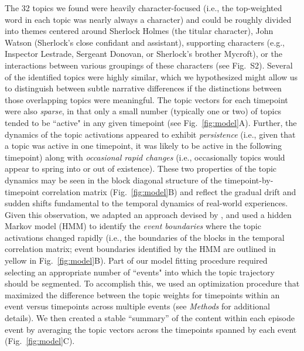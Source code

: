 \documentclass{article}
\newcommand{\topics}{S2}
\begin{document}
The 32 topics we found were heavily character-focused (i.e., the top-weighted word in each topic was nearly always a character) and could be roughly divided into themes centered around Sherlock Holmes (the titular character), John Watson (Sherlock's close confidant and assistant), supporting characters (e.g., Inspector Lestrade, Sergeant Donovan, or Sherlock's brother Mycroft), or the interactions between various groupings of these characters (see Fig.~\topics).  Several of the identified topics were highly similar, which we hypothesized might allow us to distinguish between subtle narrative differences if the distinctions between those overlapping topics were meaningful.  The topic vectors for each timepoint were also \textit{sparse}, in that only a small number (typically one or two) of topics tended to be ``active" in any given timepoint (see Fig.~\ref{fig:model}A).  Further, the dynamics of the topic activations appeared to exhibit \textit{persistence} (i.e., given that a topic was active in one timepoint, it was likely to be active in the following timepoint) along with \textit{occasional rapid changes} (i.e., occasionally topics would appear to spring into or out of existence).  These two properties of the topic dynamics may be seen in the block diagonal structure of the timepoint-by-timepoint correlation matrix (Fig.~\ref{fig:model}B) and reflect the gradual drift and sudden shifts fundamental to the temporal dynamics of real-world experiences.  Given this observation, we adapted an approach devised by \cite{BaldEtal17}, and used a hidden Markov model (HMM) to identify the \textit{event boundaries} where the topic activations changed rapidly (i.e., the boundaries of the blocks in the temporal correlation matrix; event boundaries identified by the HMM are outlined in yellow in Fig.~\ref{fig:model}B).  Part of our model fitting procedure required selecting an appropriate number of ``events" into which the topic trajectory should be segmented.  To accomplish this, we used an optimization procedure that maximized the difference between the topic weights for timepoints within an event versus timepoints across multiple events (see \textit{Methods} for additional details).  We then created a stable ``summary'' of the content within each episode event by averaging the topic vectors across the timepoints spanned by each event (Fig.~\ref{fig:model}C).
\end{document}
